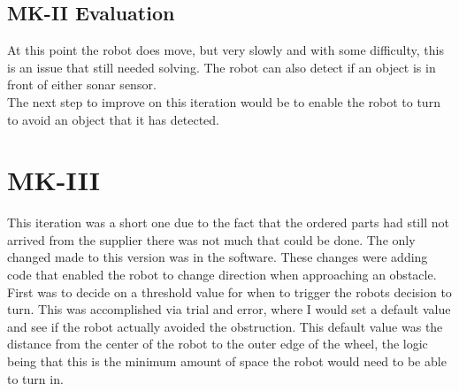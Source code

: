 \subsection{MK-II Evaluation}
At this point the robot does move, but very slowly and with some difficulty, this is an issue that still needed solving. The robot can also detect if an object is in front of either sonar sensor.
\\The next step to improve on this iteration would be to enable the robot to turn to avoid an object that it has detected.
\section{MK-III}
This iteration was a short one due to the fact that the ordered parts had still not arrived from the supplier there was not much that could be done.  The only changed made to this version was in the software.  These changes were adding code that enabled the robot to change direction when approaching an obstacle.
First was to decide on a threshold value for when to trigger the robots decision to turn.  This was accomplished via trial and error, where I would set a default value and see if the robot actually avoided the obstruction.  This default value was the distance from the center of the robot to the outer edge of the wheel, the logic being that this is the minimum amount of space the robot would need to be able to turn in.

